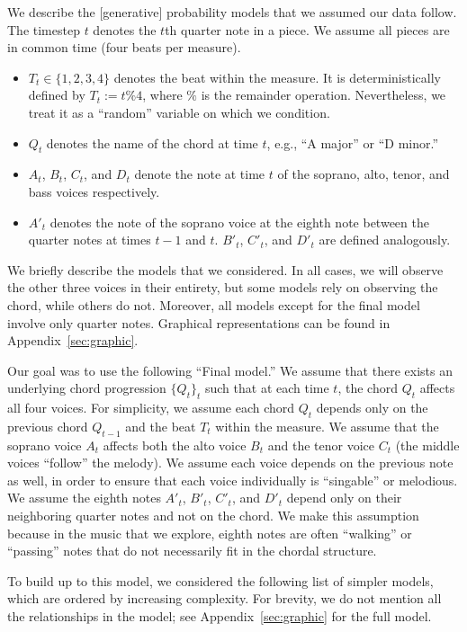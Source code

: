 \documentclass[11pt]{article}
\begin{document}
We describe the [generative] probability models that we assumed our data follow. The timestep $t$ denotes the $t$th quarter note in a piece. We assume all pieces are in common time (four beats per measure).

\begin{itemize}
\item $T_t \in \{1,2,3,4\}$ denotes the beat within the measure. It is deterministically defined by $T_t := t \% 4$, where $\%$ is the remainder operation. Nevertheless, we treat it as a ``random'' variable on which we condition.
\item $Q_t$ denotes the name of the chord at time $t$, e.g., ``A major'' or ``D minor.''
\item $A_t$, $B_t$, $C_t$, and $D_t$ denote the note at time $t$ of the soprano, alto, tenor, and bass voices respectively.
\item $A'_t$ denotes the note of the soprano voice at the eighth note between the quarter notes at times $t-1$ and $t$. $B'_t$, $C'_t$, and $D'_t$ are defined analogously.
\end{itemize}

We briefly describe the models that we considered. In all cases, we will observe the other three voices in their entirety, but some models rely on observing the chord, while others do not. Moreover, all models except for the final model involve only quarter notes. Graphical representations can be found in Appendix~\ref{sec:graphic}.

Our goal was to use the following ``Final model.'' We assume that there exists an underlying chord progression $\{Q_t\}_t$ such that at each time $t$, the chord $Q_t$ affects all four voices. For simplicity, we assume each chord $Q_t$ depends only on the previous chord $Q_{t-1}$ and the beat $T_t$ within the measure.
We assume that the soprano voice $A_t$ affects both the alto voice $B_t$ and the tenor voice $C_t$ (the middle voices ``follow'' the melody).
We assume each voice depends on the previous note as well, in order to ensure that each voice individually is ``singable'' or melodious.
We assume the eighth notes $A'_t$, $B'_t$, $C'_t$, and $D'_t$ depend only on their neighboring quarter notes and not on the chord. We make this assumption because in the music that we explore, eighth notes are often ``walking'' or ``passing'' notes that do not necessarily fit in the chordal structure.

To build up to this model, we considered the following list of simpler models, which are ordered by increasing complexity. For brevity, we do not mention all the relationships in the model; see Appendix~\ref{sec:graphic} for the full model.
\end{document}
